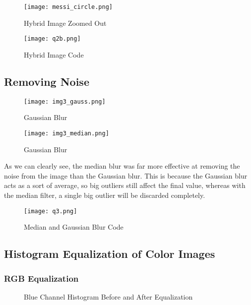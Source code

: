 \documentclass[12pt, letterpaper]{article}
\begin{document}
\begin{figure}[H]
    \centering
    \texttt{[image: messi\_circle.png]}
    \caption{Hybrid Image Zoomed Out}
\end{figure}

\begin{figure}[H]
    \centering
    \texttt{[image: q2b.png]}
    \caption{Hybrid Image Code}
\end{figure}

\subsection{Removing Noise}

\begin{figure}[H]
    \centering
    \texttt{[image: img3\_gauss.png]}
    \caption{Gaussian Blur}
\end{figure}
\begin{figure}[H]
    \centering
    \texttt{[image: img3\_median.png]}
    \caption{Gaussian Blur}
\end{figure}

As we can clearly see, the median blur was far more effective at removing the noise from the image than the Gaussian blur. This is because the Gaussian blur acts as a sort of average, so big outliers still affect the final value, whereas with the median filter, a single big outlier will be discarded completely.


\begin{figure}[H]
    \centering
    \texttt{[image: q3.png]}
    \caption{Median and Gaussian Blur Code}
\end{figure}

\subsection{Histogram Equalization of Color Images}

\subsubsection{RGB Equalization}

\begin{figure}[H]
    \centering
    \qquad
    \caption{Blue Channel Histogram Before and After Equalization}%
\end{figure}
\end{document}
